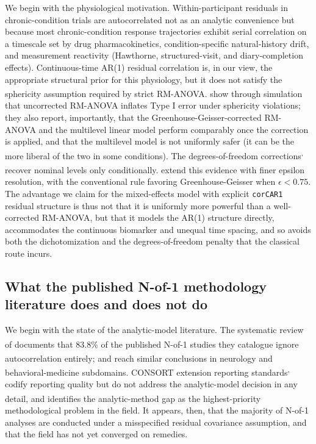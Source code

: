 \documentclass[
  11pt,
]{article}
\begin{document}
We begin with the physiological motivation. Within-participant
residuals in chronic-condition trials are autocorrelated not as
an analytic convenience but because most chronic-condition
response trajectories exhibit serial correlation on a timescale
set by drug pharmacokinetics, condition-specific natural-history
drift, and measurement reactivity (Hawthorne, structured-visit,
and diary-completion effects). Continuous-time AR(1) residual
correlation is, in our view, the appropriate structural prior for
this physiology, but it does not satisfy the sphericity assumption
required by strict RM-ANOVA.\textsuperscript{} show
through simulation that uncorrected RM-ANOVA inflates Type I error
under sphericity violations; they also report, importantly, that
the Greenhouse-Geisser-corrected RM-ANOVA and the multilevel
linear model perform comparably once the correction is applied,
and that the multilevel model is not uniformly safer (it can be
the more liberal of the two in some conditions). The
degrees-of-freedom corrections\textsuperscript{,}
recover nominal levels only conditionally.\textsuperscript{}
extend this evidence with finer epsilon resolution, with the
conventional rule favoring Greenhouse-Geisser when
\(\epsilon < 0.75\). The advantage we claim for the mixed-effects
model with explicit \texttt{corCAR1} residual structure is thus not that
it is uniformly more powerful than a well-corrected RM-ANOVA, but
that it models the AR(1) structure directly, accommodates the
continuous biomarker and unequal time spacing, and so avoids both
the dichotomization and the degrees-of-freedom penalty that the
classical route incurs.

\subsection{What the published N-of-1 methodology literature does and does not do}\label{what-the-published-n-of-1-methodology-literature-does-and-does-not-do}

We begin with the state of the analytic-model literature. The
systematic review of\textsuperscript{} documents that 83.8\% of
the published N-of-1 studies they catalogue ignore autocorrelation
entirely;\textsuperscript{} and\textsuperscript{} reach similar
conclusions in neurology and behavioral-medicine subdomains.
CONSORT extension reporting standards\textsuperscript{,} codify reporting quality but do not address
the analytic-model decision in any detail, and\textsuperscript{}
identifies the analytic-method gap as the highest-priority
methodological problem in the field. It appears, then, that the
majority of N-of-1 analyses are conducted under a misspecified
residual covariance assumption, and that the field has not yet
converged on remedies.
\end{document}
